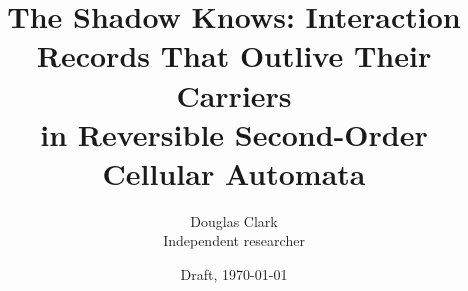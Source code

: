 \documentclass[11pt]{article}
\title{The Shadow Knows: Interaction Records That Outlive Their Carriers\\in Reversible Second-Order Cellular Automata}
\author{Douglas Clark\\\small Independent researcher}
\date{Draft, \today}
\begin{document}
\maketitle
\begin{abstract}

\end{abstract}










\end{document}
